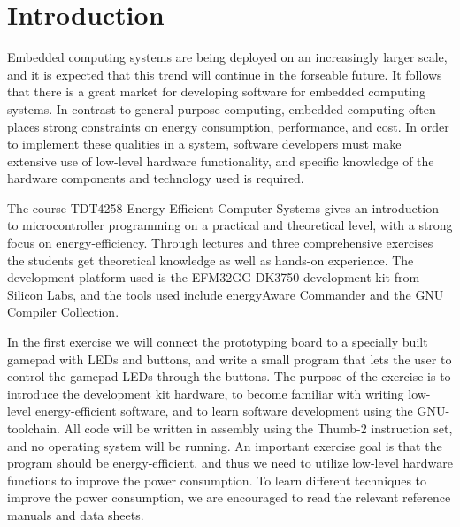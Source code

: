 \chapter{Introduction}

Embedded computing systems are being deployed on an increasingly larger scale, and it is expected that this trend will continue in the forseable future. It follows that there is a great market for developing software for embedded computing systems. In contrast to general-purpose computing, embedded computing often places strong constraints on energy consumption, performance, and cost. In order to implement these qualities in a system, software developers must make extensive use of low-level hardware functionality, and specific knowledge of the hardware components and technology used is required. 

The course TDT4258 Energy Efficient Computer Systems gives an introduction to microcontroller programming on a practical and theoretical level, with a strong focus on energy-efficiency. Through lectures and three comprehensive exercises the students get theoretical knowledge as well as hands-on experience. The development platform used is the EFM32GG-DK3750 development kit from Silicon Labs, and the tools used include energyAware Commander and the GNU Compiler Collection.

In the first exercise we will connect the prototyping board to a specially built gamepad with LEDs and buttons, and write a small program that lets the user to control the gamepad LEDs through the buttons. The purpose of the exercise is to introduce the development kit hardware, to become familiar with writing low-level energy-efficient software, and to learn software development using the GNU-toolchain. All code will be written in assembly using the Thumb-2 instruction set, and no operating system will be running. An important exercise goal is that the program should be energy-efficient, and thus we need to utilize low-level hardware functions to improve the power consumption. To learn different techniques to improve the power consumption, we are encouraged to read the relevant reference manuals and data sheets. 

